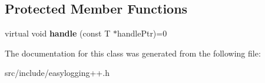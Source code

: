 \subsection*{Protected Member Functions}
\begin{DoxyCompactItemize}
\item 
\mbox{\label{classel_1_1_callback_a8997c7971d65062c374ef24e653061be}} 
virtual void {\bfseries handle} (const T $\ast$handle\+Ptr)=0
\end{DoxyCompactItemize}


The documentation for this class was generated from the following file\+:\begin{DoxyCompactItemize}
\item 
src/include/easylogging++.\+h\end{DoxyCompactItemize}
